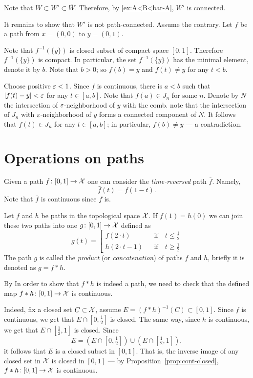 Note that $W\subset W'\subset \bar W$.
Therefore, by \ref{ex:A<B<bar-A}, $W'$ is connected.

It remains to show that $W'$ is not path-connected.
Assume the contrary. 
Let $f$ be a path from $x=(0,0)$ to $y=(0,1)$.

Note that $f^{-1}(\{y\})$ is closed subset of compact space $[0,1]$.
Therefore $f^{-1}(\{y\})$ is compact.
In particular, the set $f^{-1}(\{y\})$ has the minimal element,
denote it by $b$.
Note that $b>0$; so $f(b)=y$ and $f(t)\ne y$ for any $t<b$.

Choose positive $\varepsilon<1$.
Since $f$ is continuous, there is $a<b$ such that $|f(t)-y|<\varepsilon$ for any $t\in [a,b]$.
Note that $f(a)\in J_n$ for some $n$.
Denote by $N$ the intersection of $\varepsilon$-neighborhood of $y$ with the comb.
note that the intersection of $J_n$ with $\varepsilon$-neighborhood of $y$ forms a connected component of $N$.
It follows that $f(t)\in J_n$ for any $t\in [a,b]$;
in particular, $f(b)\ne y$ --- a contradiction.
\qeds

\section{Operations on paths}\label{sec:Operations on paths}

Given a path $f\colon[0,1]\to \mathcal{X}$ one can consider the \emph{time-reversed} path $\bar f$.
Namely, 
\[\bar f(t)=f(1-t).\]
Note that $\bar f$ is continuous since $f$ is.

Let $f$ and $h$ be paths in the topological space $\mathcal{X}$.
If $f(1)=h(0)$ we can join these two paths into one $g\colon[0,1]\to \mathcal{X}$ defined as 
\[g(t)=
\left[
\begin{aligned}
f(2\cdot t)&&\text{if}&\ t\le \tfrac12
\\
h(2\cdot t-1)&&\text{if}&\ t\ge \tfrac12
\end{aligned}
\right.
\]
The path $g$ is called the \emph{product} (or \emph{concatenation}) of paths $f$ and $h$, briefly it is denoted as $g=f * h$.

By 
In order to show that $f * h$ is indeed a path, we need to check that the defined map $f * h\colon[0,1]\to \mathcal{X}$ is continuous.

Indeed, fix a closed set $C\subset \mathcal{X}$,
assume $E=(f * h)^{-1}(C)\subset [0,1]$.
Since $f$ is continuous, we get that $E\cap [0,\tfrac12]$ is closed.
The same way, since $h$ is continuous, we get that $E\cap [\tfrac12,1]$ is closed.
Since 
\[E=(E\cap [0,\tfrac12])\cup (E\cap [\tfrac12,1]),\] 
it follows that $E$ is a closed subset in $[0,1]$.
That is, the inverse image of any closed set in $\mathcal{X}$ is closed in $[0,1]$ --- by Proposition~\ref{prop:cont-closed}, $f * h\colon[0,1]\to \mathcal{X}$ is continuous.


